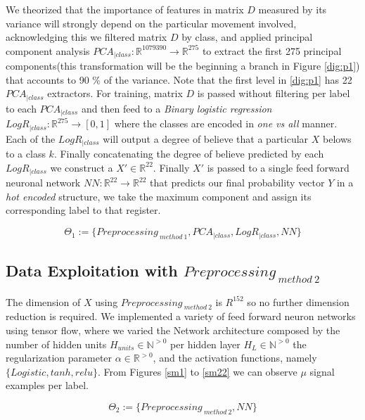 We theorized that the importance of features in matrix $D$ measured by its variance will strongly depend on the particular movement involved, acknowledging this we filtered matrix $D$ by class, and applied principal component analysis $PCA_{|class}: \mathbb{R}^{1079390} \longrightarrow \mathbb{R}^{275}$ to extract the first 275 principal components(this transformation will be the beginning a branch in Figure \ref{dig:p1}) that accounts to 90 $\%$ of the variance. Note that the first level in \ref{dig:p1} has 22 $PCA_{|class}$ extractors. For training, matrix $D$ is passed without filtering per label to each $PCA_{|class}$ and then feed to a \textit{Binary logistic regression} $LogR_{|class}: \mathbb{R}^{275} \longrightarrow [0,1]$ where the classes are encoded in \textit{one vs all} manner. Each of the $LogR_{|class}$ will output a degree of believe that a particular $X$ belows to a class $k$. Finally concatenating the degree of believe predicted by each $LogR_{|class}$ we construct a $X' \in \mathbb{R}^{22}$. Finally $X'$ is passed to a single feed forward neuronal network $NN: \mathbb{R}^{22} \longrightarrow  \mathbb{R}^{22} $ that predicts our final probability vector $Y$ in a \textit{hot encoded} structure, we take the maximum component and assign its corresponding label to that register.


\begin{equation}
\Theta_{1}:= \{ Preprocessing_{ \ method \ 1},PCA_{|class},LogR_{|class},NN \}
\label{eq:1}
\end{equation}


\subsection{Data Exploitation with $Preprocessing_{ \ method \ 2}$}
The dimension of $X$ using $Preprocessing_{ \ method \ 2}$ is $R^{152}$ so no further dimension reduction is required. We implemented a variety of feed forward neuron networks using tensor flow, where we varied the Network architecture composed by the number of hidden units $H_{units} \in \mathbb{N}^{>0}$ per hidden layer $H_{L} \in \mathbb{N}^{>0}$ the regularization parameter $\alpha \in \mathbb{R}^{>0}$, and the activation functions, namely $ \{  Logistic, tanh, relu \}$. From Figures \ref{sm1} to  \ref{sm22} we can observe $\mu$ signal examples per label.

\begin{equation}
\Theta_{2}:= \{ Preprocessing_{ \ method \ 2},NN \}
\label{eq:2}
\end{equation}


